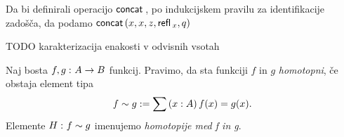 \begin{konstrukcija}
  Da bi definirali operacijo \(\textnormal{\textsf{concat}}\,\), po indukcijskem pravilu za
  identifikacije zadošča, da podamo \(\textnormal{\textsf{concat}}\,(x, x, z, \textnormal{\textsf{refl}}\,_{x}, q)\)
\end{konstrukcija}

\begin{trditev}
  \label{eq-Sigma}
  TODO karakterizacija enakosti v odvisnih vsotah
\end{trditev}

\begin{definicija}
  Naj bosta \(f, g \,\colon A \to B\) funkcij. Pravimo, da sta funkciji \(f\) in \(g\)
  \emph{homotopni}, če obstaja element tipa
  \[f \sim g := \sum \left( x : A \right) f(x) = g(x).\]
  Elemente \(H \,\colon f \sim g\) imenujemo \emph{homotopije med f in g}.
\end{definicija}

